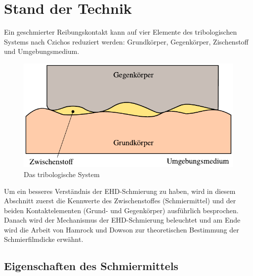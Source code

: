 \chapter{Stand der Technik}
\label{chap:stand_der_technik}

Ein geschmierter Reibungskontakt kann auf vier Elemente des tribologischen Systems nach Czichos\cite{czichos} reduziert werden: Grundkörper, Gegenkörper, Zischenstoff und Umgebungsmedium.
\begin{figure}[htb]
    \centering
    \includegraphics[]{./images/tribologisches_system.pdf}
    \caption{Das tribologische System\cite{wisniewski}}
    \label{fig:das_tribologische_system}
\end{figure}

Um ein besseres Verständnis der EHD-Schmierung zu haben, wird in diesem Abschnitt zuerst die Kennwerte des Zwischenstoffes (Schmiermittel) und der beiden Kontaktelementen (Grund- und Gegenkörper) ausführlich besprochen.
Danach wird der Mechanismus der EHD-Schmierung beleuchtet und am Ende wird die Arbeit von Hamrock und Dowson zur theoretischen Bestimmung der Schmierfilmdicke erwähnt.

\section{Eigenschaften des Schmiermittels}
\label{sec:eigenschaften_des_schmiermittels}

